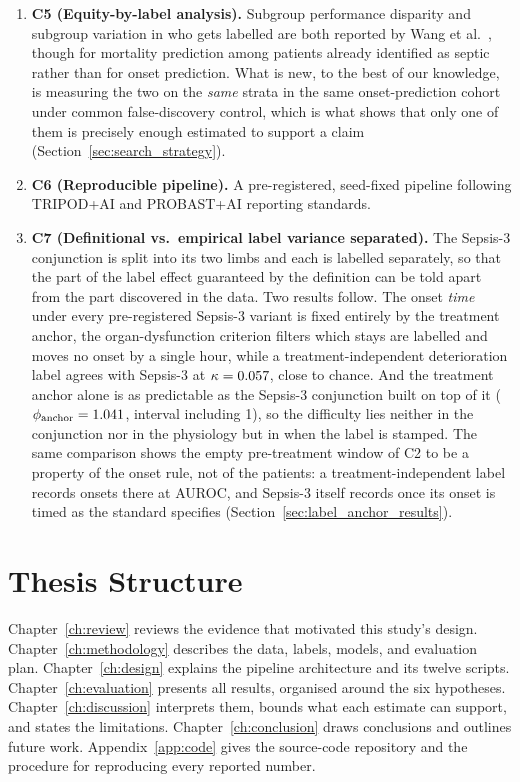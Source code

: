 \begin{enumerate}
    \item \textbf{C5 (Equity-by-label analysis).} Subgroup performance
    disparity and subgroup variation in who gets labelled are both reported by
    Wang et al.\ \cite{wang2022equity}, though for mortality prediction among
    patients already identified as septic rather than for onset prediction.
    What is new, to the best of our knowledge, is measuring the two on the
    \emph{same} strata in the same onset-prediction cohort under common
    false-discovery control, which is what shows that only one of them is
    precisely enough estimated to support a claim
    (Section~\ref{sec:search_strategy}).

    \item \textbf{C6 (Reproducible pipeline).} A pre-registered, seed-fixed
    pipeline following TRIPOD+AI \cite{collins2024tripodai} and PROBAST+AI
    \cite{moons2025probastai} reporting standards.

    \item \textbf{C7 (Definitional vs.\ empirical label variance separated).}
    The Sepsis-3 conjunction is split into its two limbs and each is labelled
    separately, so that the part of the label effect guaranteed by the
    definition can be told apart from the part discovered in the data. Two
    results follow. The onset \emph{time} under every pre-registered Sepsis-3
    variant is fixed entirely by the treatment anchor, the organ-dysfunction
    criterion filters which stays are labelled and moves no onset by a single
    hour, while a treatment-independent deterioration label agrees with
    Sepsis-3 at $\kappa = 0.057$, close to chance. And the treatment
    anchor alone is as predictable as the Sepsis-3 conjunction built on top of
    it ($\phi_{\text{anchor}} = 1.041$, interval including 1), so
    the difficulty lies neither in the conjunction nor in the physiology but in
    when the label is stamped. The same
    comparison shows the empty pre-treatment window of C2 to be a property of
    the onset rule, not of the patients: a treatment-independent label records
    \pcPreTreatOnsetsVarD{} onsets there at \pcPreTreatAurocPrimaryD{} AUROC,
    and Sepsis-3 itself records \pcPreTreatOnsetsVarF{} once its onset is timed
    as the standard specifies (Section~\ref{sec:label_anchor_results}).
\end{enumerate}


\section{Thesis Structure}

Chapter~\ref{ch:review} reviews the evidence that motivated this study's design.
Chapter~\ref{ch:methodology} describes the data, labels, models, and evaluation
plan.
Chapter~\ref{ch:design} explains the pipeline architecture and its twelve
scripts.
Chapter~\ref{ch:evaluation} presents all results, organised around the six
hypotheses.
Chapter~\ref{ch:discussion} interprets them, bounds what each estimate can
support, and states the limitations.
Chapter~\ref{ch:conclusion} draws conclusions and outlines future work.
Appendix~\ref{app:code} gives the source-code repository and the procedure for
reproducing every reported number.
